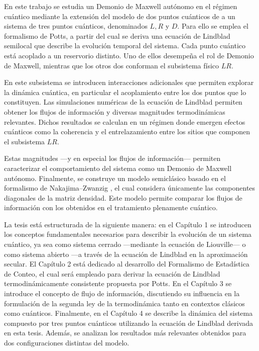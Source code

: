 En este trabajo se estudia un Demonio de Maxwell autónomo en el régimen cuántico mediante la extensión del modelo de dos puntos cuánticos de \cite{horowitz2014thermodynamics} a un sistema de tres puntos cuánticos, denominados $L,R$ y $D$. Para ello se emplea el formalismo de Potts, a partir del cual se deriva una ecuación de Lindblad semilocal que describe la evolución temporal del sistema. Cada punto cuántico está acoplado a un reservorio distinto. Uno de ellos desempeña el rol de Demonio de Maxwell, mientras que los otros dos conforman el subsistema físico $LR$.

En este subsistema se introducen interacciones adicionales que permiten explorar la dinámica cuántica, en particular el acoplamiento entre los dos puntos que lo constituyen. Las simulaciones numéricas de la ecuación de Lindblad permiten obtener los flujos de información y diversas magnitudes termodinámicas relevantes. Dichos resultados se calculan en un régimen donde emergen efectos cuánticos como la coherencia y el entrelazamiento entre los sitios que componen el subsistema $LR$.

Estas magnitudes ---y en especial los flujos de información--- permiten caracterizar el comportamiento del sistema como un Demonio de Maxwell autónomo. 
Finalmente, se construye un modelo semiclásico basado en el formalismo de Nakajima--Zwanzig \cite{zwanzig1966statistical}, el cual considera únicamente las componentes diagonales de la matriz densidad. Este modelo permite comparar los flujos de información con los obtenidos en el tratamiento plenamente cuántico.


La tesis está estructurada de la siguiente manera: en el Capítulo 1 se introducen los conceptos fundamentales necesarios para describir la evolución de un sistema cuántico, ya sea como sistema cerrado —mediante la ecuación de Liouville— o como sistema abierto —a través de la ecuación de Lindblad en la aproximación secular. El Capítulo 2 está dedicado al desarrollo del Formalismo de Estadística de Conteo, el cual será empleado para derivar la ecuación de Lindblad termodinámicamente consistente propuesta por Potts. En el Capítulo 3 se introduce el concepto de flujo de información, discutiendo su influencia en la formulación de la segunda ley de la termodinámica tanto en contextos clásicos como cuánticos. Finalmente, en el Capítulo 4 se describe la dinámica del sistema compuesto por tres puntos cuánticos utilizando la ecuación de Lindblad derivada en esta tesis. Además, se analizan los resultados más relevantes obtenidos para dos configuraciones distintas del modelo.




